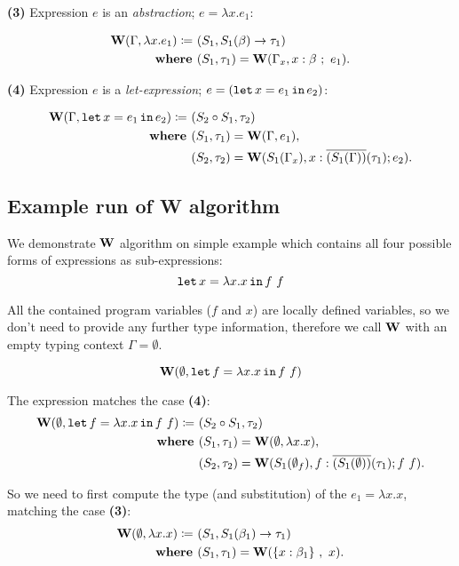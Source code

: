 \documentclass[a4paper,oneside]{memoir}
\begin{document}
\textbf{(3)} Expression $e$ is an \textit{abstraction}; $e = \lambda x . e_1$:

\begin{align*}
\operatorname{\textbf{W}}(\Gamma, \lambda x .e_1) \coloneqq ~ & (S_1, S_1(\beta) \rightarrow \tau_1 ) \\
\operatorname{\textbf{where~}} & (S_1, \tau_1) = \operatorname{\textbf{W}}(\Gamma_x, x : \beta ~;~ e_1). \\
\end{align*}



\textbf{(4)} Expression $e$ is a \textit{let-expression}; $e = (\texttt{let} \, x = e_1 \, \texttt{in} \, e_2)$:

\begin{align*}
\operatorname{\textbf{W}}(\Gamma, \texttt{let} \, x = e_1 \, \texttt{in} \, e_2) \coloneqq ~ & (S_2 \circ S_1, \tau_2) \\
\operatorname{\textbf{where~}} & (S_1, \tau_1) = \operatorname{\textbf{W}}(\Gamma, e_1), \\
       & (S_2, \tau_2) = \operatorname{\textbf{W}}(S_1(\Gamma_x),x:\overline{(S_1(\Gamma))}(\tau_1); e_2). \\
\end{align*}

\subsection{Example run of W algorithm}

We demonstrate $\operatorname{\textbf{W}}$ algorithm on simple example which contains all four possible forms of expressions as sub-expressions:
$$\texttt{let} \, x = \lambda x . x \, \texttt{in} \, f~f$$

All the contained program variables
($f$ and $x$) are locally defined variables, so we don't need to provide any further type
information, therefore we call $\operatorname{\textbf{W}}$ with an empty typing context $\Gamma = \emptyset$. 

$$\operatorname{\textbf{W}}(\emptyset, \texttt{let} \, f = \lambda x . x \, \texttt{in} \, f~f)$$

The expression matches the case \textbf{(4)}:
\begin{align*}
\operatorname{\textbf{W}}(\emptyset, \texttt{let} \, f = \lambda x . x \, \texttt{in} \, f~f) \coloneqq ~ & (S_2 \circ S_1, \tau_2) \\
\operatorname{\textbf{where~}} & (S_1, \tau_1) = \operatorname{\textbf{W}}(\emptyset, \lambda x . x), \\
       & (S_2, \tau_2) = \operatorname{\textbf{W}}(S_1(\emptyset_f),f:\overline{(S_1(\emptyset))}(\tau_1); f~f).
\end{align*}

So we need to first compute the type (and substitution) of the $e_1 = \lambda x . x$, matching the case \textbf{(3)}:
\begin{align*}
\operatorname{\textbf{W}}(\emptyset, \lambda x .x) \coloneqq ~ & (S_1, S_1(\beta_1) \rightarrow \tau_1 ) \\
\operatorname{\textbf{where~}} & (S_1, \tau_1) = \operatorname{\textbf{W}}(\{x : \beta_1 \}~,~ x).
\end{align*}
\end{document}

